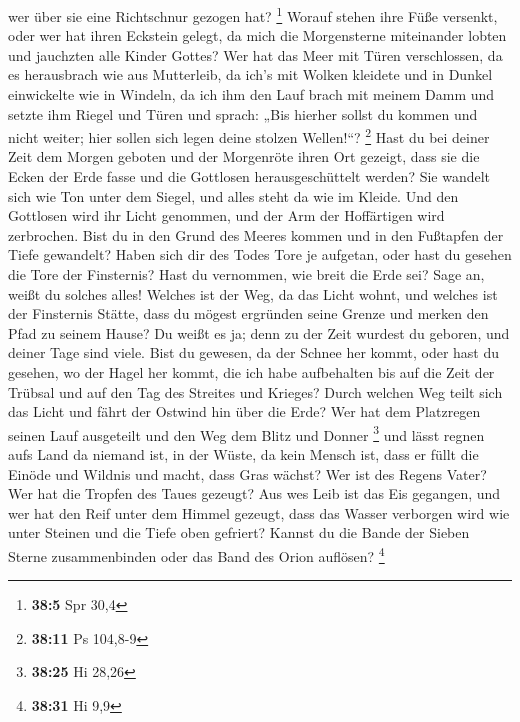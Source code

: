 wer über sie eine Richtschnur gezogen hat? \footnote{\textbf{38:5} Spr
  30,4}  Worauf stehen ihre Füße versenkt, oder wer hat
ihren Eckstein gelegt,  da mich die Morgensterne miteinander
lobten und jauchzten alle Kinder Gottes?  Wer hat das Meer
mit Türen verschlossen, da es herausbrach wie aus Mutterleib,
 da ich's mit Wolken kleidete und in Dunkel einwickelte wie
in Windeln,  da ich ihm den Lauf brach mit meinem Damm und
setzte ihm Riegel und Türen  und sprach: „Bis hierher
sollst du kommen und nicht weiter; hier sollen sich legen deine stolzen
Wellen!{}``? \footnote{\textbf{38:11} Ps 104,8-9}  Hast du
bei deiner Zeit dem Morgen geboten und der Morgenröte ihren Ort gezeigt,
 dass sie die Ecken der Erde fasse und die Gottlosen
herausgeschüttelt werden?  Sie wandelt sich wie Ton unter
dem Siegel, und alles steht da wie im Kleide.  Und den
Gottlosen wird ihr Licht genommen, und der Arm der Hoffärtigen wird
zerbrochen.  Bist du in den Grund des Meeres kommen und in
den Fußtapfen der Tiefe gewandelt?  Haben sich dir des
Todes Tore je aufgetan, oder hast du gesehen die Tore der Finsternis?
 Hast du vernommen, wie breit die Erde sei? Sage an, weißt
du solches alles!  Welches ist der Weg, da das Licht wohnt,
und welches ist der Finsternis Stätte,  dass du mögest
ergründen seine Grenze und merken den Pfad zu seinem Hause?
 Du weißt es ja; denn zu der Zeit wurdest du geboren, und
deiner Tage sind viele.  Bist du gewesen, da der Schnee her
kommt, oder hast du gesehen, wo der Hagel her kommt,  die
ich habe aufbehalten bis auf die Zeit der Trübsal und auf den Tag des
Streites und Krieges?  Durch welchen Weg teilt sich das
Licht und fährt der Ostwind hin über die Erde?  Wer hat dem
Platzregen seinen Lauf ausgeteilt und den Weg dem Blitz und Donner
\footnote{\textbf{38:25} Hi 28,26}  und lässt regnen aufs
Land da niemand ist, in der Wüste, da kein Mensch ist, 
dass er füllt die Einöde und Wildnis und macht, dass Gras wächst?
 Wer ist des Regens Vater? Wer hat die Tropfen des Taues
gezeugt?  Aus wes Leib ist das Eis gegangen, und wer hat
den Reif unter dem Himmel gezeugt,  dass das Wasser
verborgen wird wie unter Steinen und die Tiefe oben gefriert?
 Kannst du die Bande der Sieben Sterne zusammenbinden oder
das Band des Orion auflösen? \footnote{\textbf{38:31} Hi 9,9}
